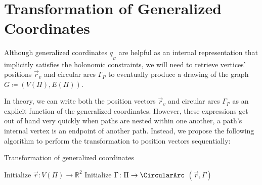\section{Transformation of Generalized Coordinates}
\label{sect:transformation-of-generalized-coordinates}

Although generalized coordinates ${q_{_\Pi}}$ are helpful as an internal representation that implicitly satisfies the holonomic constraints, we will need to retrieve vertices' positions ${\vec{r}_v}$ and circular arcs ${\Gamma_P}$ to eventually produce a drawing of the graph ${G \coloneqq (V(\Pi), E(\Pi))}$.


In theory, we can write both the position vectors ${\vec{r}_v}$ and circular arcs ${\Gamma_P}$ as an explicit function of the generalized coordinates. However, these expressions get out of hand very quickly when paths are nested within one another, \ie{} a path's internal vertex is an endpoint of another path. Instead, we propose the following algorithm to perform the transformation to position vectors sequentially:

\bigskip

\begin{algorithm}[H]
  \caption{Transformation of generalized coordinates}
  \label{algo:transformation-of-generalized-coordinate}
  \vspace{5pt}
  \vspace{-4pt}
  \vspace{5pt}
  Initialize ${\vec{r} \colon V(\Pi) \to \mathbb{R}^2}$\;
  Initialize ${\Gamma \colon \Pi \to \CircularArc}$\;
  \;
  \;
  \;
  \Return $(\vec{r}, \Gamma)$
\end{algorithm}

